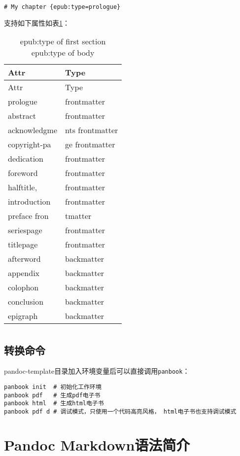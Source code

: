 \documentclass[fancyhdr,bookmark]{ctexbook}
\newcommand{\passthrough}[1]{#1}
\begin{document}
\begin{lstlisting}[label=code:epub-type-attr, caption=code:epub-type-attr, float=htbp]
# My chapter {epub:type=prologue}
\end{lstlisting}

支持如下属性如表\ref{table:epub-type-attr}：

\begin{longtable}[]{@{}ll@{}}
\caption{epub:type of first section epub:type of body
\label{table:epub-type-attr}}\tabularnewline
\toprule
Attr & Type\tabularnewline
\midrule
\endfirsthead
\toprule
Attr & Type\tabularnewline
\midrule
\endhead
prologue & frontmatter\tabularnewline
abstract & frontmatter\tabularnewline
acknowledgme & nts frontmatter\tabularnewline
copyright-pa & ge frontmatter\tabularnewline
dedication & frontmatter\tabularnewline
foreword & frontmatter\tabularnewline
halftitle, & frontmatter\tabularnewline
introduction & frontmatter\tabularnewline
preface fron & tmatter\tabularnewline
seriespage & frontmatter\tabularnewline
titlepage & frontmatter\tabularnewline
afterword & backmatter\tabularnewline
appendix & backmatter\tabularnewline
colophon & backmatter\tabularnewline
conclusion & backmatter\tabularnewline
epigraph & backmatter\tabularnewline
\bottomrule
\end{longtable}

\hypertarget{section}{%
\chapter{}\label{section}}

\hypertarget{ux8f6cux6362ux547dux4ee4}{%
\section{转换命令}\label{ux8f6cux6362ux547dux4ee4}}

pandoc-template目录加入环境变量后可以直接调用\passthrough{\lstinline!panbook!}：

\begin{lstlisting}
panbook init  # 初始化工作环境
panbook pdf   # 生成pdf电子书
panbook html  # 生成html电子书
panbook pdf d # 调试模式，只使用一个代码高亮风格， html电子书也支持调试模式
\end{lstlisting}

\hypertarget{pandoc-markdownux8bedux6cd5ux7b80ux4ecb}{%
\chapter{Pandoc
Markdown语法简介}\label{pandoc-markdownux8bedux6cd5ux7b80ux4ecb}}
\end{document}
